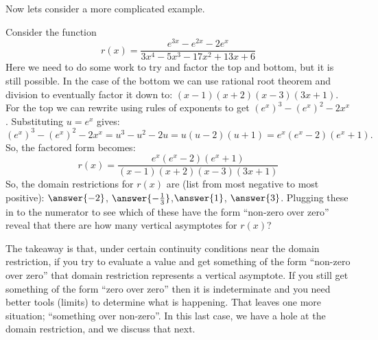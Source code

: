 \documentclass{ximera}
\begin{document}
Now lets consider a more complicated example.

\begin{example}
    Consider the function
    \[
        r(x) = \frac{e^{3x} - e^{2x} - 2e^x}{3x^4 - 5x^3 - 17x^2 + 13 x + 6}
    \]
    Here we need to do some work to try and factor the top and bottom, but it is still possible. In the case of the bottom we can use rational root theorem and division to eventually factor it down to: $(x-1)(x+2)(x-3)(3x+1)$. For the top we can rewrite using rules of exponents to get $(e^x)^3 - (e^x)^2 -2x^x$. Substituting $u=e^x$ gives:
    \[
        (e^x)^3 - (e^x)^2 -2x^x = u^3 - u^2 - 2u = u(u-2)(u+1) = e^x(e^x-2)(e^x+1).
    \]
    So, the factored form becomes:
    \[
        r(x) = \frac{e^x(e^x-2)(e^x+1)}{(x-1)(x+2)(x-3)(3x+1)}
    \]
    So, the domain restrictions for $r(x)$ are (list from most negative to most positive): $\answer{-2}$, $\answer{-\frac{1}{3}}$,$\answer{1}$, $\answer{3}$.
    Plugging these in to the numerator to see which of these have the form ``non-zero over zero'' reveal that there are how many vertical asymptotes for $r(x)$?
    \begin{multipleChoice}
    \end{multipleChoice}
\end{example}

The takeaway is that, under certain continuity conditions near the domain restriction, if you try to evaluate a value and get something of the form ``non-zero over zero'' that domain restriction represents a vertical asymptote. If you still get something of the form ``zero over zero'' then it is indeterminate and you need better tools (limits) to determine what is happening. That leaves one more situation; ``something over non-zero''. In this last case, we have a hole at the domain restriction, and we discuss that next.
\end{document}
